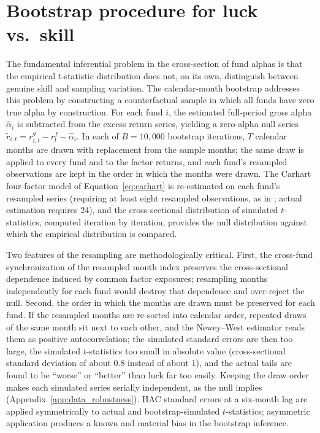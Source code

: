 \documentclass[12pt, oneside]{report}
\begin{document}
\section{Bootstrap procedure for luck vs.\ skill}
\label{sec:bootstrap_methodology}

\noindent The fundamental inferential problem in the cross-section of
fund alphas is that the empirical $t$-statistic distribution does not,
on its own, distinguish between genuine skill and sampling variation.
The \textcite{FamaFrench2010} calendar-month bootstrap addresses this
problem by constructing a counterfactual sample in which all funds have
zero true alpha by construction. For each fund $i$, the estimated
full-period gross alpha $\hat{\alpha}_i$ is subtracted from the excess
return series, yielding a zero-alpha null series
$\tilde{r}_{i,t} = r^g_{i,t} - r^f_t - \hat{\alpha}_i$. In each of
$B = 10{,}000$ bootstrap iterations, $T$ calendar months are drawn with
replacement from the sample months; the same draw is applied to every
fund and to the factor returns, and each fund's resampled observations
are kept in the order in which the months were drawn. The Carhart
four-factor model of Equation~\ref{eq:carhart} is re-estimated on each
fund's resampled series (requiring at least eight resampled
observations, as in \textcite{FamaFrench2010}; actual estimation requires
24), and the cross-sectional distribution of simulated
$t$-statistics, computed iteration by iteration, provides the null
distribution against which the empirical distribution is compared.

Two features of the resampling are methodologically critical. First,
the cross-fund synchronization of the resampled month index preserves
the cross-sectional dependence induced by common factor exposures;
resampling months independently for each fund would destroy that
dependence and over-reject the null. Second, the order in which the
months are drawn must be preserved for each fund. If the resampled
months are re-sorted into calendar order, repeated draws of the same
month sit next to each other, and the Newey--West estimator reads them as
positive autocorrelation; the simulated standard errors are then too
large, the simulated $t$-statistics too small in absolute value
(cross-sectional standard deviation of about 0.8 instead of about 1), and
the actual tails are found to be ``worse'' or ``better'' than luck far too
easily. Keeping the draw order makes each simulated series serially
independent, as the null implies (Appendix~\ref{app:data_robustness}). \textcite{NeweyWest1987} HAC standard errors at a six-month lag
are applied symmetrically to actual and bootstrap-simulated
$t$-statistics; asymmetric application produces a known and material
bias in the bootstrap inference.
\end{document}
